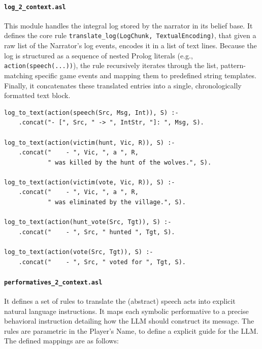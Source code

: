 \paragraph{\textbf{\texttt{log\_2\_context.asl}}} 
This module handles the integral log stored by the narrator in its belief base. It defines the core rule \texttt{translate\_log(LogChunk, TextualEncoding)}, that given a raw list of the Narrator's log events, encodes it in a list of text lines. Because the log is structured as a sequence of nested Prolog literals (e.g., \texttt{action(speech(...))}), the rule recursively iterates through the list, pattern-matching specific game events and mapping them to predefined string templates. Finally, it concatenates these translated entries into a single, chronologically formatted text block. 

\begin{verbatim}
log_to_text(action(speech(Src, Msg, Int)), S) :-
    .concat("- [", Src, " -> ", IntStr, "]: ", Msg, S).

log_to_text(action(victim(hunt, Vic, R)), S) :-
    .concat("    - ", Vic, ", a ", R, 
            " was killed by the hunt of the wolves.", S).

log_to_text(action(victim(vote, Vic, R)), S) :-
    .concat("    - ", Vic, ", a ", R, 
            " was eliminated by the village.", S). 

log_to_text(action(hunt_vote(Src, Tgt)), S) :-
    .concat("    - ", Src, " hunted ", Tgt, S).

log_to_text(action(vote(Src, Tgt)), S) :-
    .concat("    - ", Src, " voted for ", Tgt, S).
\end{verbatim}

\paragraph{\textbf{\texttt{performatives\_2\_context.asl}}} 
It defines a set of rules to translate the (abstract) speech acts into explicit natural language instructions. It maps each symbolic performative to a precise behavioral instruction detailing how the LLM should construct its message. The rules are parametric in the Player's Name, to define a explicit guide for the LLM. The defined mappings are as follows:

